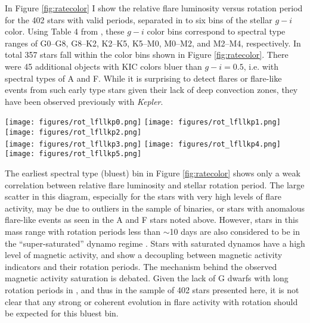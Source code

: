 \documentclass[twocolumn]{aastex6}
\newcommand{\Kepler}{\textsl{Kepler}\xspace}
\begin{document}
In Figure \ref{fig:ratecolor} I show the relative flare luminosity versus rotation period for the 402 stars with valid periods, separated in to six bins of the stellar $g-i$ color. Using Table 4 from \citet{covey2007}, these $g-i$ color bins correspond to spectral type ranges of G0--G8, G8--K2, K2--K5, K5--M0, M0--M2, and M2--M4, respectively. In total 357 stars fall within the color bins shown in Figure \ref{fig:ratecolor}. There were 45 additional objects with KIC colors bluer than $g-i=0.5$, i.e. with spectral types of A and F. While it is surprising to detect flares or flare-like events from such early type stars given their lack of deep convection zones, they have been observed previously with \Kepler \citep{balona2012}. 



\begin{figure*}[!t]
\centering
\texttt{[image: figures/rot\_lfllkp0.png]}
\texttt{[image: figures/rot\_lfllkp1.png]}
\texttt{[image: figures/rot\_lfllkp2.png]}\\
\texttt{[image: figures/rot\_lfllkp3.png]}
\texttt{[image: figures/rot\_lfllkp4.png]}
\texttt{[image: figures/rot\_lfllkp5.png]}
\caption{
Relative flare luminosity versus rotation period for six cuts in $(g-i)$ color space. Each data point represents the total flare luminosity for a star that passes the sample cuts described in the text, and has a valid rotation period from \citet{mcquillan2014}. The number of stars in each bin is indicated in the panel titles. The selected color ranges correspond to approximate spectral types of G0--G8, G8--K2, K2--K5, K5--M0, M0--M2, and M2--M4 according to the observed $g-i$ colors from Table 4 of \citet{covey2007}. A significant decrease in flare luminosity is seen as a function of rotation period for each subsample.
}
\label{fig:ratecolor}
\end{figure*}




The earliest spectral type (bluest) bin in Figure \ref{fig:ratecolor} shows only a weak correlation between relative flare luminosity and stellar rotation period. The large scatter in this diagram, especially for the stars with very high levels of flare activity, may be due to outliers in the sample of binaries, or stars with anomalous flare-like events as seen in the A and F stars noted above. However, stars in this mass range with rotation periods less than $\sim$10 days are also considered to be in the ``super-saturated'' dynamo regime \citet[e.g.][]{argiroffi2016}. Stars with saturated dynamos have a high level of magnetic activity, and show a decoupling between magnetic activity indicators and their rotation periods. The mechanism behind  the observed magnetic activity saturation is debated. Given the lack of G dwarfs with long rotation periods in \citet{mcquillan2014}, and thus in the sample of 402 stars presented here, it is not clear that any strong or coherent evolution in flare activity with rotation should be expected for this bluest bin.
\end{document}
